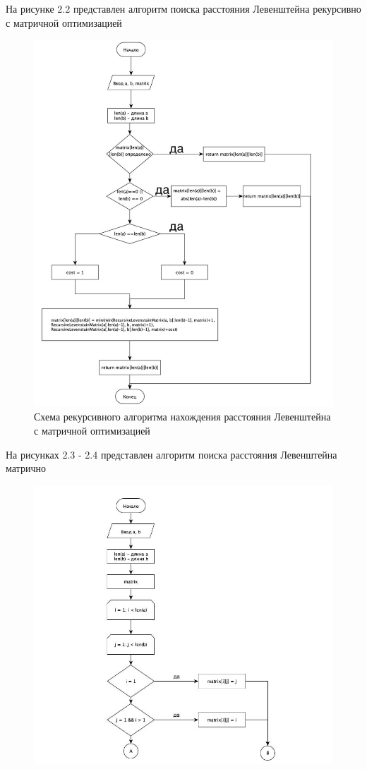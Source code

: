 \documentclass[12pt]{report}
\begin{document}
\newpage
\newpage
На рисунке 2.2 представлен алгоритм поиска расстояния Левенштейна рекурсивно с матричной оптимизацией
\begin{figure}[h]
    \centering
    \includegraphics[width=0.70	\linewidth]{2.jpg}
    \caption{Схема рекурсивного алгоритма нахождения расстояния Левенштейна с матричной оптимизацией}
    \label{fig:mpr}
\end{figure}

\newpage
\newpage
На рисунках 2.3 - 2.4 представлен алгоритм поиска расстояния Левенштейна матрично
\begin{figure}[H]
    \centering
    \caption{}
    \includegraphics[width=0.80\linewidth]{3_1.jpeg}
    \label{fig:mpr}
\end{figure}
\end{document}
